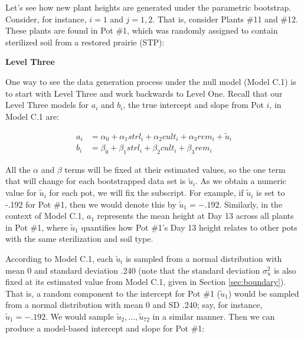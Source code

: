 \documentclass[
]{krantz}
\begin{document}
Let's see how new plant heights are generated under the parametric bootstrap. Consider, for instance, \(i=1\) and \(j=1,2\). That is, consider Plants \#11 and \#12. These plants are found in Pot \#1, which was randomly assigned to contain sterilized soil from a restored prairie (STP):

\begin{table}

\caption{\label{tab:10verb7}Original data for Plants 11 and 12 from Pot 1}
\centering
{}
\end{table}

\textbf{Level Three}

One way to see the data generation process under the null model (Model C.1) is to start with Level Three and work backwards to Level One. Recall that our Level Three models for \(a_{i}\) and \(b_{i}\), the true intercept and slope from Pot \(i\), in Model C.1 are:

\begin{align*}
a_{i} & = \alpha_{0}+\alpha_{1}\textstyle{strl}_{i}+\alpha_{2}\textstyle{cult}_{i}+\alpha_{3}\textstyle{rem}_{i}+\tilde{u}_{i} \\
b_{i} & = \beta_{0}+\beta_{1}\textstyle{strl}_{i}+\beta_{2}\textstyle{cult}_{i}+\beta_{3}\textstyle{rem}_{i}
\end{align*}

All the \(\alpha\) and \(\beta\) terms will be fixed at their estimated values, so the one term that will change for each bootstrapped data set is \(\tilde{u}_{i}\). As we obtain a numeric value for \(\tilde{u}_{i}\) for each pot, we will fix the subscript. For example, if \(\tilde{u}_{i}\) is set to -.192 for Pot \#1, then we would denote this by \(\tilde{u}_{1}=-.192\). Similarly, in the context of Model C.1, \(a_{1}\) represents the mean height at Day 13 across all plants in Pot \#1, where \(\tilde{u}_{1}\) quantifies how Pot \#1's Day 13 height relates to other pots with the same sterilization and soil type.

According to Model C.1, each \(\tilde{u}_{i}\) is sampled from a normal distribution with mean 0 and standard deviation .240 (note that the standard deviation \(\sigma^2_{u}\) is also fixed at its estimated value from Model C.1, given in Section \ref{sec:boundary}). That is, a random component to the intercept for Pot \#1 (\(\tilde{u}_{1}\)) would be sampled from a normal distribution with mean 0 and SD .240; say, for instance, \(\tilde{u}_{1}=-.192\). We would sample \(\tilde{u}_{2},...,\tilde{u}_{72}\) in a similar manner. Then we can produce a model-based intercept and slope for Pot \#1:
\end{document}
